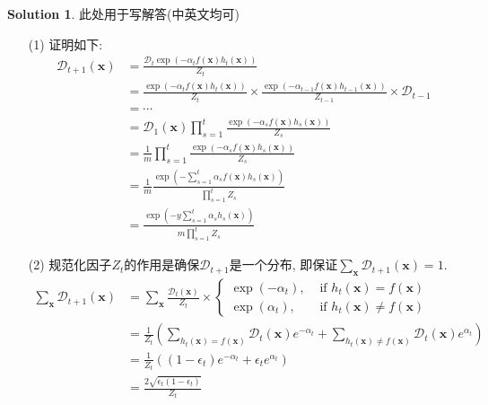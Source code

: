 \documentclass[a4paper,UTF8]{article}
\numberwithin{equation}{section}
\theoremstyle{definition}
\newtheorem*{solution}{Solution}
\begin{document}
\begin{solution}
	此处用于写解答(中英文均可)
    \begin{enumerate}
        \item [(1)]
        证明如下:
        \begin{equation}
            \begin{aligned} \mathcal{D}_{t+1}(\boldsymbol{x}) & = \frac{\mathcal{D}_{t}\exp \left(-\alpha_{t} f(\boldsymbol{x}) h_{t}(\boldsymbol{x})\right)}{Z_{t}} \\ &= \frac{\exp \left(-\alpha_{t} f(\boldsymbol{x}) h_{t}(\boldsymbol{x})\right)}{Z_{t}} \times \frac{\exp \left(-\alpha_{t-1} f(\boldsymbol{x}) h_{t-1}(\boldsymbol{x})\right)}{Z_{t-1}} \times \mathcal{D}_{t-1}\\ &= \cdots \\&= \mathcal{D}_{1}(\boldsymbol{x}) \prod_{s=1}^{t} \frac{\exp \left(-\alpha_{s} f(\boldsymbol{x}) h_{s}(\boldsymbol{x})\right)}{Z_{s}}\\& =\frac{1}{m} \prod_{s=1}^{t} \frac{\exp \left(-\alpha_{s} f(\boldsymbol{x}) h_{s}(\boldsymbol{x})\right)}{Z_{s}} \\ & =\frac{1}{m} \frac{\exp \left(-\sum_{s=1}^{t} \alpha_{s} f(\boldsymbol{x}) h_{s}(\boldsymbol{x})\right)}{\prod_{s=1}^{t} Z_{s}} \\ & =\frac{\exp \left(-y \sum_{s=1}^{t} \alpha_{s} h_{s}(\boldsymbol{x})\right)}{m \prod_{s=1}^{t} Z_{s}}\end{aligned} \nonumber
        \end{equation}
        \item [(2)]
        规范化因子$Z_t$的作用是确保$\mathcal{D}_{t+1}$是一个分布, 即保证$\sum_{\boldsymbol{x}} \mathcal{D}_{t+1}(\boldsymbol{x}) = 1$. \\
        \begin{equation}
            \begin{aligned}
                \sum_{\boldsymbol{x}} \mathcal{D}_{t+1}(\boldsymbol{x})&=\sum_{\boldsymbol{x}} \frac{\mathcal{D}_{t}(\boldsymbol{x})}{Z_{t}} \times\left\{\begin{array}{ll}\exp \left(-\alpha_{t}\right), & \text { if } h_{t}(\boldsymbol{x})=f(\boldsymbol{x}) \\ \exp \left(\alpha_{t}\right), & \text { if } h_{t}(\boldsymbol{x}) \neq f(\boldsymbol{x})\end{array}\right. \\ & =\frac{1}{Z_{t}}\left(\sum_{h_{t}(\boldsymbol{x})=f(\boldsymbol{x})} \mathcal{D}_{t}(\boldsymbol{x}) e^{-\alpha_{t}}+\sum_{h_{t}(\boldsymbol{x}) \neq f(\boldsymbol{x})} \mathcal{D}_{t}(\boldsymbol{x}) e^{\alpha_{t}}\right) \\ & =\frac{1}{Z_{t}}\left(\left(1-\epsilon_{t}\right) e^{-\alpha_{t}}+\epsilon_{t} e^{\alpha_{t}}\right) \\ & =\frac{2 \sqrt{\epsilon_{t}\left(1-\epsilon_{t}\right)}}{Z_{t}}

\end{aligned}
\end{equation}
\end{enumerate}
\end{solution}
\end{document}
